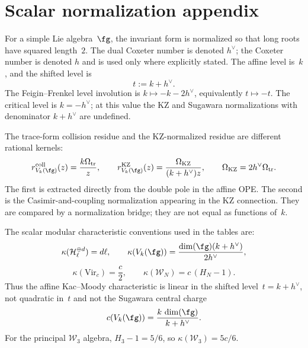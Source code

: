 \section{Scalar normalization appendix}
\label{sec:scalar-normalization-appendix}

\begin{convention}
\label{conv:scalar-normalization-master}
\ClaimStatusDefinitional{}
For a simple Lie algebra~$\fg$, the invariant form is normalized so
that long roots have squared length~$2$.  The dual Coxeter number is
denoted $h^\vee$; the Coxeter number is denoted $h$ and is used only
where explicitly stated.  The affine level is~$k$, and the shifted
level is
\[
t:=k+h^\vee .
\]
The Feigin--Frenkel level involution is
$k\mapsto -k-2h^\vee$, equivalently $t\mapsto -t$.
The critical level is $k=-h^\vee$; at this value the KZ and Sugawara
normalizations with denominator $k+h^\vee$ are undefined.
\end{convention}

\begin{convention}
\label{conv:collision-kz-normalization}
\ClaimStatusDefinitional{}
The trace-form collision residue and the KZ-normalized residue are
different rational kernels:
\[
r^{\mathrm{coll}}_{V_k(\fg)}(z)
=\frac{k\Omega_{\mathrm{tr}}}{z},
\qquad
r^{\mathrm{KZ}}_{V_k(\fg)}(z)
=\frac{\Omega_{\mathrm{KZ}}}{(k+h^\vee)z},
\qquad
\Omega_{\mathrm{KZ}}=2h^\vee\Omega_{\mathrm{tr}}.
\]
The first is extracted directly from the double pole in the affine OPE.
The second is the Casimir-and-coupling normalization appearing in the
KZ connection.  They are compared by a normalization bridge; they are
not equal as functions of~$k$.
\end{convention}

\begin{convention}
\label{conv:scalar-kappa-normalizations}
\ClaimStatusDefinitional{}
The scalar modular characteristic conventions used in the tables are:
\[
\kappa(\mathcal H_\ell^{\oplus d})=d\ell,\qquad
\kappa(V_k(\fg))=\frac{\dim(\fg)(k+h^\vee)}{2h^\vee},
\]
\[
\kappa(\mathrm{Vir}_c)=\frac{c}{2},\qquad
\kappa(\mathcal W_N)=c\,(H_N-1).
\]
Thus the affine Kac--Moody characteristic is linear in the shifted
level~$t=k+h^\vee$, not quadratic in~$t$ and not the Sugawara central
charge
\[
c(V_k(\fg))=\frac{k\,\dim(\fg)}{k+h^\vee}.
\]
For the principal $\mathcal W_3$ algebra, $H_3-1=5/6$, so
$\kappa(\mathcal W_3)=5c/6$.
\end{convention}


